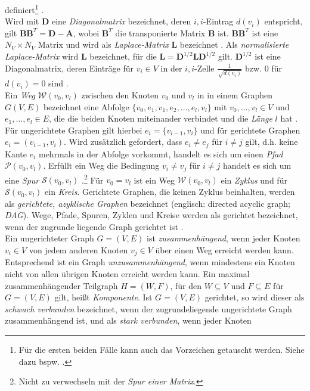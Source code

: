 \documentclass[12pt, a4paper]{report}
\begin{document}
definiert\footnote{Für die ersten beiden Fälle kann auch das Vorzeichen getauscht werden. Siehe dazu bspw. .} \cite{brandes2005graphfunda}.\\
Wird mit $\textbf{D}$ eine \textit{Diagonalmatrix} bezeichnet, deren $i,i$-Eintrag $d(v_i)$ entspricht, gilt $\textbf{BB}^T=\textbf{D}-\textbf{A}$, wobei $\textbf{B}^T$ die transponierte Matrix $\textbf{B}$ ist. $\textbf{BB}^T$ ist eine $N_V \times N_V$ Matrix und wird als \textit{Laplace-Matrix} $\textbf{L}$ bezeichnet \cite{kolaczyk2009statistical}. Als \textit{normalisierte Laplace-Matrix} wird $\textbf{\~L}$ bezeichnet, für die $\textbf{\~L}=\textbf{D}^{1/2}\textbf{L}\textbf{D}^{1/2}$ gilt. $\textbf{D}^{1/2}$ ist eine Diagonalmatrix, deren Einträge für $v_i \in V$ in der $i,i$-Zelle $\frac{1}{\sqrt{d(v_i)}}$ bzw. $0$ für $d(v_i)=0$ sind \cite{brandes2005graphfunda}.\\

Ein \textit{Weg} $\mathcal{W}(v_0,v_l)$ zwischen den Knoten $v_0$ und $v_l$ in in einem Graphen $G(V,E)$ bezeichnet eine Abfolge $\{v_0, e_1, v_1, e_2, \dots,e_l,v_l \}$ mit $v_0, \dots, v_l \in V$ und $e_1,\dots,e_l \in E$, die die beiden Knoten miteinander verbindet und die \textit{Länge} $l$ hat \cite{diestel2006graph}. Für ungerichtete Graphen gilt hierbei $e_i=\{v_{i-1}, v_i\}$ und für gerichtete Graphen $e_i=(v_{i-1}, v_i)$. Wird zusätzlich gefordert, dass $e_i \neq e_j$ für $i \neq j$ gilt, d.h. keine Kante $e_i$ mehrmals in der Abfolge vorkommt, handelt es sich um einen \textit{Pfad} $\mathcal{P}(v_0,v_l)$. Erfüllt ein Weg die Bedingung $v_i \neq v_j$ für $i \neq j$ handelt es sich um eine \textit{Spur} $\mathcal{S}(v_0,v_l)$  \cite{brandes2005graphfunda}.\footnote{Nicht zu verwechseln mit der \textit{Spur einer Matrix}.} Für $v_0 = v_l$ ist ein Weg $\mathcal{W}(v_0,v_l)$ ein \textit{Zyklus} und für $\mathcal{S}(v_0,v_l)$ ein \textit{Kreis}. Gerichtete Graphen, die keinen Zyklus beinhalten, werden als \textit{gerichtete, azyklische Graphen} bezeichnet (englisch: directed acyclic graph; \textit{DAG}). Wege, Pfade, Spuren, Zyklen und Kreise werden als gerichtet bezeichnet, wenn der zugrunde liegende Graph gerichtet ist \cite{kolaczyk2009statistical}.\\

Ein ungerichteter Graph $G=(V,E)$ ist \textit{zusammenhängend}, wenn jeder Knoten $v_i \in V$ von jedem anderen Knoten $v_j \in V$ über einen Weg erreicht werden kann. Entsprechend ist ein Graph \textit{unzusammenhängend}, wenn mindestens ein Knoten nicht von allen übrigen Knoten erreicht werden kann. Ein maximal zusammenhängender Teilgraph $H=(W,F)$, für den $W \subseteq V$ und $F \subseteq E$ für $G=(V,E)$ gilt, heißt \textit{Komponente}. Ist $G=(V,E)$ gerichtet, so wird dieser als \textit{schwach verbunden} bezeichnet, wenn der zugrundeliegende ungerichtete Graph zusammenhängend ist, und als \textit{stark verbunden}, wenn jeder Knoten 
\end{document}
